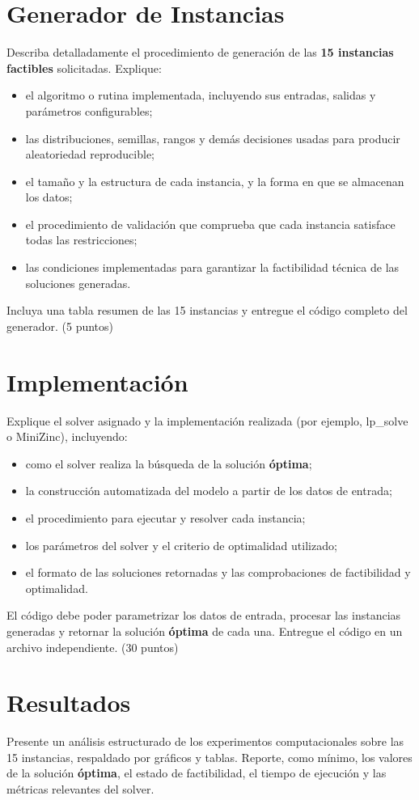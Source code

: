 \documentclass[journal, 12pt, onecolumn]{IEEEtran}
\begin{document}
\section{Generador de Instancias}
Describa detalladamente el procedimiento de generaci\'on de las \textbf{15
instancias factibles} solicitadas. Explique:
\begin{itemize}
	\item el algoritmo o rutina implementada, incluyendo sus entradas, salidas y
	par\'ametros configurables;
	\item las distribuciones, semillas, rangos y dem\'as decisiones usadas para
	producir aleatoriedad reproducible;
	\item el tama\~no y la estructura de cada instancia, y la forma en que se
	almacenan los datos;
    \item el procedimiento de validaci\'on que comprueba que cada instancia
    satisface todas las restricciones;
    \item las condiciones implementadas para garantizar la factibilidad
    t\'ecnica de las soluciones generadas.
\end{itemize}
Incluya una tabla resumen de las 15 instancias y entregue el c\'odigo completo
del generador. (5 puntos)

\section{Implementaci\'on}
Explique el solver asignado y la implementaci\'on realizada (por ejemplo,
lp\_solve o MiniZinc), incluyendo:
\begin{itemize}
	\item como el solver realiza la b\'usqueda de la soluci\'on \textbf{\'optima};
	\item la construcci\'on automatizada del modelo a partir de los datos de
	entrada;
	\item el procedimiento para ejecutar y resolver cada instancia;
	\item los par\'ametros del solver y el criterio de optimalidad utilizado;
	\item el formato de las soluciones retornadas y las comprobaciones de
	factibilidad y optimalidad.
\end{itemize}
El c\'odigo debe poder parametrizar los datos de entrada, procesar las
instancias generadas y retornar la soluci\'on \textbf{\'optima} de cada una.
Entregue el c\'odigo en un archivo independiente.
(30 puntos)

\section{Resultados}
Presente un an\'alisis estructurado de los experimentos computacionales sobre
las 15 instancias, respaldado por gr\'aficos y tablas. Reporte, como m\'inimo,
los valores de la soluci\'on \textbf{\'optima}, el estado de factibilidad, el
tiempo de ejecuci\'on y las m\'etricas relevantes del solver.
\end{document}

